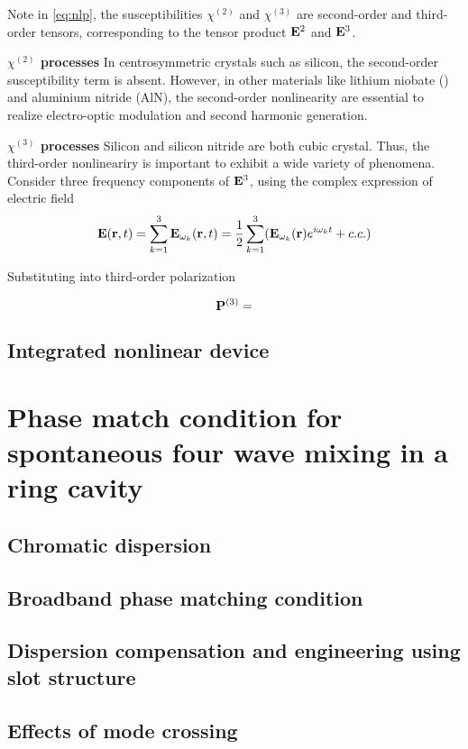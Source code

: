 \documentclass[final]{kuee_en}
\begin{document}
Note in \autoref{eq:nlp}, the susceptibilities $\chi^{(2)}$ and $\chi^{(3)}$ are  second-order and third-order tensors, corresponding to the tensor product $\vb{E}^2$ and $\vb{E}^3$.

\textbf{$\chi^{(2)}$ processes} In centrosymmetric crystals such as silicon, the second-order susceptibility term is absent. However, in other materials like lithium niobate () and aluminium nitride (AlN), the second-order nonlinearity are essential to realize electro-optic modulation and second harmonic generation.

\textbf{$\chi^{(3)}$ processes} Silicon and silicon nitride are both cubic crystal. Thus, the third-order nonlineariry is important to exhibit a wide variety of phenomena. Consider three frequency components of $\vb{E}^3$, using the complex expression of electric field
\begin{equation}
    \vb{E}(\vb{r}, t) = \sum_{k=1}^3 \vb{E}_{\omega_k}(\vb{r}, t) = \frac{1}{2} \sum_{k=1}^3 \large ( \vb{E}_{\omega_k}(\vb{r})e^{i\omega_k t} + c.c.)
\end{equation}

Substituting into third-order polarization

\begin{equation}
    \vb{P}^{(3)} = 
\end{equation}


\section{Integrated nonlinear device}

\chapter{Phase match condition for spontaneous four wave mixing in a ring cavity }
\section{Chromatic dispersion}

\section{Broadband phase matching condition}
\section{Dispersion compensation and engineering using slot structure}
\section{Effects of mode crossing}
\end{document}
